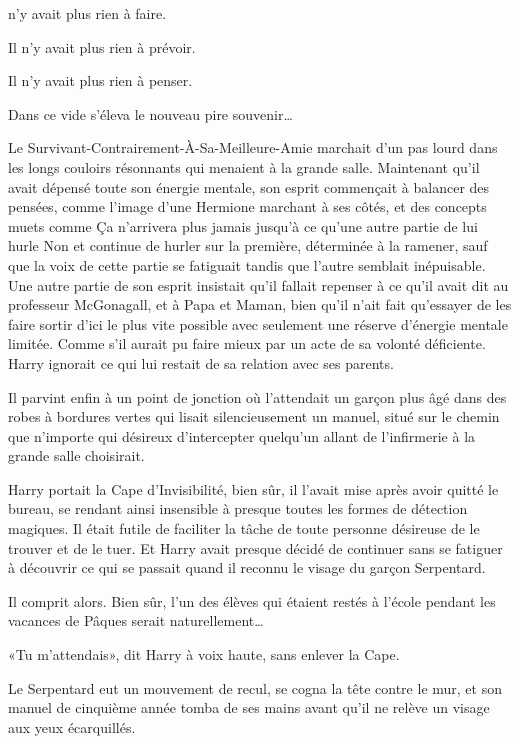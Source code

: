 
 n'y avait plus rien à faire.

\hplettrineextrapara
Il n'y avait plus rien à prévoir.

Il n'y avait plus rien à penser.

Dans ce vide s'éleva le nouveau pire souvenir…

Le Survivant-Contrairement-À-Sa-Meilleure-Amie marchait d'un pas lourd dans les longs couloirs résonnants qui menaient à la grande salle. Maintenant qu'il avait dépensé toute son énergie mentale, son esprit commençait à balancer des pensées, comme l'image d'une Hermione marchant à ses côtés, et des concepts muets comme Ça n'arrivera plus jamais jusqu'à ce qu'une autre partie de lui hurle Non et continue de hurler sur la première, déterminée à la ramener, sauf que la voix de cette partie se fatiguait tandis que l'autre semblait inépuisable. Une autre partie de son esprit insistait qu'il fallait repenser à ce qu'il avait dit au professeur McGonagall, et à Papa et Maman, bien qu'il n'ait fait qu'essayer de les faire sortir d'ici le plus vite possible avec seulement une réserve d'énergie mentale limitée. Comme s'il aurait pu faire mieux par un acte de sa volonté déficiente. Harry ignorait ce qui lui restait de sa relation avec ses parents.

Il parvint enfin à un point de jonction où l'attendait un garçon plus âgé dans des robes à bordures vertes qui lisait silencieusement un manuel, situé sur le chemin que n'importe qui désireux d'intercepter quelqu'un allant de l'infirmerie à la grande salle choisirait.

Harry portait la Cape d'Invisibilité, bien sûr, il l'avait mise après avoir quitté le bureau, se rendant ainsi insensible à presque toutes les formes de détection magiques. Il était futile de faciliter la tâche de toute personne désireuse de le trouver et de le tuer. Et Harry avait presque décidé de continuer sans se fatiguer à découvrir ce qui se passait quand il reconnu le visage du garçon Serpentard.

Il comprit alors. Bien sûr, l'un des élèves qui étaient restés à l'école pendant les vacances de Pâques serait naturellement…

«Tu m'attendais», dit Harry à voix haute, sans enlever la Cape.

Le Serpentard eut un mouvement de recul, se cogna la tête contre le mur, et son manuel de cinquième année tomba de ses mains avant qu'il ne relève un visage aux yeux écarquillés.

